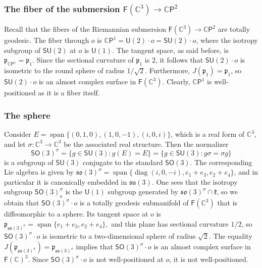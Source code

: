 \documentclass[11pt,a4paper,final]{amsart}
\newcommand{\s}{\mathsf}
\newcommand{\g}{\mathfrak}
\newcommand{\C}{\mathbb{C}}
\newcommand{\vecspan}{\operatorname{span}}
\theoremstyle{definition}
\begin{document}
\subsubsection{The fiber of the submersion $\mathsf{F}(\C^{3})\to \C\mathsf{P}^{2}$ \cite[Example~3.1]{CwiklinskiVrancken}}
Recall that the fibers of the Riemannian submersion $\mathsf{F}(\C^{3})\to\C\mathsf{P}^{2}$ are totally geodesic.
The fiber through $o$ is $\C\mathsf{P}^{1}=\mathsf{U}(2)\cdot o=\mathsf{SU}(2)\cdot o$, where the isotropy subgroup of $\mathsf{SU}(2)$ at $o$ is $\mathsf{U}(1)$.
The tangent space, as said before, is $\g{p}_{\C\mathsf{P}^{1}}=\g{p}_{1}$.
Since the sectional curvature of $\g{p}_{1}$ is $2$, it follows that $\mathsf{SU}(2)\cdot o$ is isometric to the round sphere of radius $1/\sqrt{2}$.
Furthermore, $J(\g{p}_{1})=\g{p}_{1}$, so $\mathsf{SU}(2)\cdot o$ is an almost complex surface in $\mathsf{F}(\C^{3})$.
Clearly, $\C\s{P}^{1}$ is well-positioned as it is a fiber itself.
	
\subsubsection{The sphere \cite[Example~3.2]{CwiklinskiVrancken}}
Consider $E=\vecspan\{(0,1,0),(1,0,-1),(i,0,i)\}$, which is a real form of $\C^3$, and let $\sigma\colon \C^{3}\to \C^{3}$ be the associated real structure.
Then the normalizer
\begin{equation*}
	\mathsf{SO}(3)^{\sigma}=\{g\in \mathsf{SU}(3)\colon g(E)=E\}=\{g\in\mathsf{SU}(3)\colon g\sigma=\sigma g\}
\end{equation*}
is a subgroup of $\mathsf{SU}(3)$ conjugate to the standard $\mathsf{SO}(3)$.
The corresponding Lie algebra is given by $\g{so}(3)^{\sigma}=\vecspan\{ \operatorname{diag}(i,0,-i),e_{1}+e_{3},e_{2}+e_{4}\}$, and in particular it is canonically embedded in $\g{su}(3)$.
One sees that the isotropy subgroup $\mathsf{SO}(3)^{\sigma}_{o}$ is the $\mathsf{U}(1)$ subgroup generated by $\g{so}(3)^{\sigma}\cap\g{k}$, so we obtain that $\mathsf{SO}(3)^{\sigma}\cdot o$ is a totally geodesic submanifold of $\mathsf{F}(\C^{3})$ that is diffeomorphic to a sphere.
Its tangent space at $o$ is
$
	\g{p}_{\g{so}(3)^{\sigma}}=\vecspan\{e_{1}+e_{3},e_{2}+e_{4}\},
$
and this plane has sectional curvature $1/2$, so $\mathsf{SO}(3)^{\sigma}\cdot o$ is isometric to a two-dimensional sphere of radius $\sqrt{2}$.
The equality $J(\g{p}_{\g{so}(3)^{\sigma}})=\g{p}_{\g{so}(3)^{\sigma}}$ implies that $\mathsf{SO}(3)^{\sigma}\cdot o$ is an almost complex surface in $\mathsf{F}(\C)^{3}$.
Since $\mathsf{SO}(3)^{\sigma}\cdot o$ is not well-positioned at $o$, it is not well-positioned.
	
\end{document}

